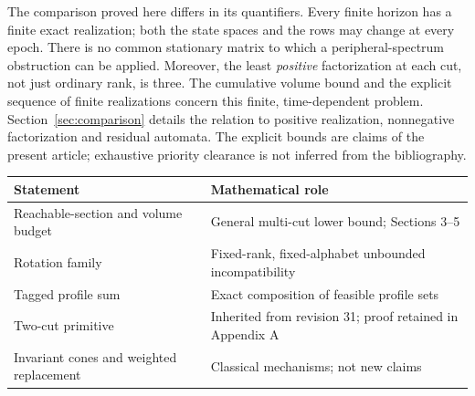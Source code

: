 The comparison proved here differs in its quantifiers. Every finite
horizon has a finite exact realization; both the state spaces and the
rows may change at every epoch. There is no common stationary matrix to
which a peripheral-spectrum obstruction can be applied. Moreover, the
least \emph{positive} factorization at each cut, not just ordinary rank,
is three. The cumulative volume bound and the explicit sequence of
finite realizations concern this finite, time-dependent problem.
Section~\ref{sec:comparison} details the relation to positive realization,
nonnegative factorization and residual automata. The explicit bounds
are claims of the present article; exhaustive priority clearance is not
inferred from the bibliography.

\begin{center}
\small
\begin{tabular}{p{}p{}}
\toprule
Statement & Mathematical role\\\midrule
Reachable-section and volume budget & General multi-cut lower bound; Sections 3--5\\
Rotation family & Fixed-rank, fixed-alphabet unbounded incompatibility\\
Tagged profile sum & Exact composition of feasible profile sets\\
Two-cut primitive & Inherited from revision 31; proof retained in Appendix A\\
Invariant cones and weighted replacement & Classical mechanisms; not new claims\\
\bottomrule
\end{tabular}
\end{center}
